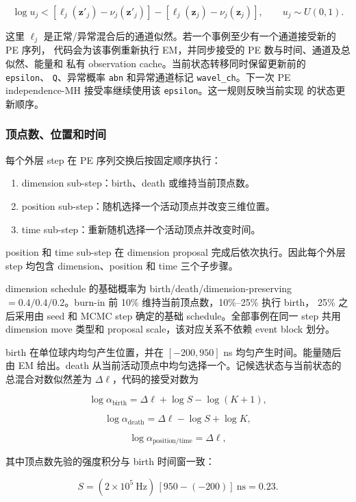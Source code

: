 \documentclass[UTF8,a4paper,11pt]{ctexart}
\providecommand{\tightlist}{%
  \setlength{\itemsep}{0pt}\setlength{\parskip}{0pt}}
\begin{document}
\[
\log u_j
<
\left[\ell_j(\mathbf z'_j)-\nu_j(\mathbf z'_j)\right]
-\left[\ell_j(\mathbf z_j)-\nu_j(\mathbf z_j)\right],
\qquad u_j\sim U(0,1).
\]

这里 \(\ell_j\) 是正常/异常混合后的通道似然。若一个事例至少有一个通道接受新的 PE 序列，
代码会为该事例重新执行 EM，并同步接受的 PE 数与时间、通道及总似然、能量和
私有 observation cache。当前状态转移同时保留更新前的 \texttt{epsilon}、
\texttt{Q}、异常概率 \texttt{abn} 和异常通道标记 \texttt{wavel\_ch}。下一次
PE independence-MH 接受率继续使用该 \texttt{epsilon}。这一规则反映当前实现
的状态更新顺序。

\subsubsection{顶点数、位置和时间}

每个外层 step 在 PE 序列交换后按固定顺序执行：

\begin{enumerate}
\def\labelenumi{\arabic{enumi}.}
\tightlist
\item
  dimension sub-step：birth、death 或维持当前顶点数。
\item
  position sub-step：随机选择一个活动顶点并改变三维位置。
\item
  time sub-step：重新随机选择一个活动顶点并改变时间。
\end{enumerate}

position 和 time sub-step 在 dimension proposal 完成后依次执行。因此每个外层
step 均包含 dimension、position 和 time 三个子步骤。

dimension schedule 的基础概率为 birth/death/dimension-preserving
\(=0.4/0.4/0.2\)。burn-in 前 10\% 维持当前顶点数，10\%--25\% 执行 birth，
25\% 之后采用由 seed 和 MCMC step 确定的基础 schedule。全部事例在同一 step 共用
dimension move 类型和 proposal scale，该对应关系不依赖 event block 划分。

birth 在单位球内均匀产生位置，并在 \([-200,950]\) ns 均匀产生时间。能量随后由 EM 给出。death 从当前活动顶点中均匀选择一个。记候选状态与当前状态的总混合对数似然差为 \(\Delta\ell\)，代码的接受对数为

\[
\log\alpha_{\mathrm{birth}}
=\Delta\ell+\log S-\log(K+1),
\]

\[
\log\alpha_{\mathrm{death}}
=\Delta\ell-\log S+\log K,
\]

\[
\log\alpha_{\mathrm{position/time}}=\Delta\ell,
\]

其中顶点数先验的强度积分与 birth 时间窗一致：

\[
S=(2\times10^5\ \mathrm{Hz})\,[950-(-200)]\ \mathrm{ns}=0.23.
\]
\end{document}

